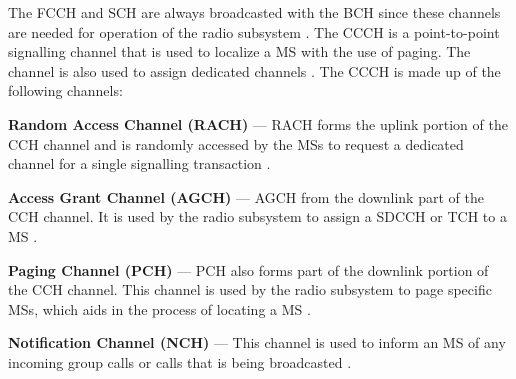 The FCCH and SCH are always broadcasted with the BCH since these channels are needed for operation of the radio subsystem \cite{GSMArchitectureProtocolsServices}. The CCCH is a point-to-point signalling channel that is used to localize a MS with the use of paging. The channel is also used to assign dedicated channels \cite{GSMArchitectureProtocolsServices}. The CCCH is made up of the following channels:
\begin{description}
\item{\textbf{Random Access Channel (RACH)}} --- RACH forms the uplink portion of the CCH channel and is randomly accessed by the MSs to request a dedicated channel for a single signalling transaction \cite{GSMArchitectureProtocolsServices}.
\item{\textbf{Access Grant Channel (AGCH)}} --- AGCH from the downlink part of the CCH channel. It is used by the radio subsystem to assign a SDCCH or TCH to a MS \cite{GSMArchitectureProtocolsServices}.
\item{\textbf{Paging Channel (PCH)}} --- PCH also forms part of the downlink portion of the CCH channel. This channel is used by the radio subsystem to page specific MSs, which aids in the process of locating a MS \cite{GSMArchitectureProtocolsServices}.
\item{\textbf{Notification Channel (NCH)}} --- This channel is used to inform an MS of any incoming group calls or calls that is being broadcasted \cite{GSMArchitectureProtocolsServices}.
\end{description}

